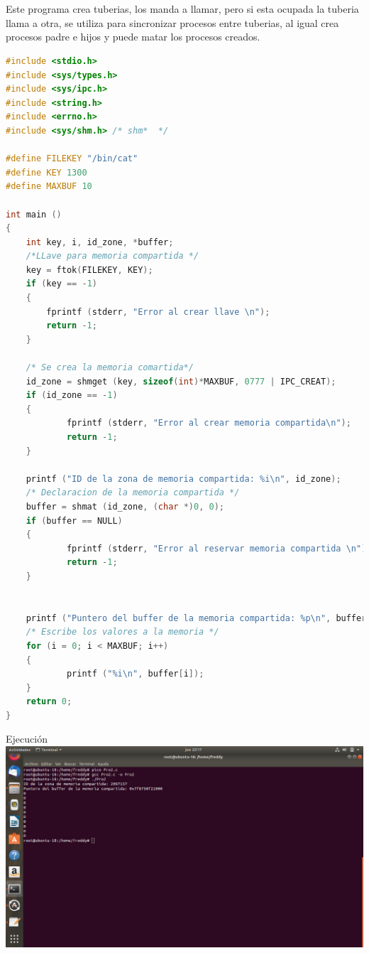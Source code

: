 \documentclass[11pt,a4paper]{report}
\begin{document}
\\
\\
Este programa crea tuberias, los manda a llamar, pero si esta ocupada la tuberia llama a otra, se utiliza para sincronizar procesos entre tuberias, al igual crea procesos padre e hijos y puede matar los procesos creados.
\clearpage
\begin{lstlisting}[language=C++, caption={pro2}]
#include <stdio.h>
#include <sys/types.h>
#include <sys/ipc.h>
#include <string.h>
#include <errno.h>
#include <sys/shm.h> /* shm*  */

#define FILEKEY "/bin/cat"
#define KEY 1300
#define MAXBUF 10

int main ()
{
	int key, i, id_zone, *buffer;
   	/*LLave para memoria compartida */
	key = ftok(FILEKEY, KEY);
   	if (key == -1)
	{
		fprintf (stderr, "Error al crear llave \n");
      	return -1;
   	}

   	/* Se crea la memoria comartida*/
   	id_zone = shmget (key, sizeof(int)*MAXBUF, 0777 | IPC_CREAT);
   	if (id_zone == -1)
	{
      		fprintf (stderr, "Error al crear memoria compartida\n");
      		return -1;
   	}

   	printf ("ID de la zona de memoria compartida: %i\n", id_zone);
   	/* Declaracion de la memoria compartida */
   	buffer = shmat (id_zone, (char *)0, 0);
   	if (buffer == NULL)
	{
      		fprintf (stderr, "Error al reservar memoria compartida \n");
      		return -1;
   	}


	printf ("Puntero del buffer de la memoria compartida: %p\n", buffer);
   	/* Escribe los valores a la memoria */
   	for (i = 0; i < MAXBUF; i++)
	{
      		printf ("%i\n", buffer[i]);
	}
   	return 0;
}
\end{lstlisting}
\clearpage
Ejecuci\'on\\
\includegraphics[scale=.35]{pro2.png}
\\
\end{document}
